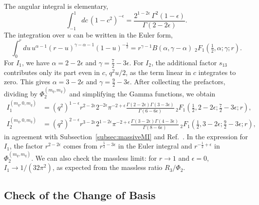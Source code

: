 The angular integral is elementary,
\begin{equation}
    \int_{-1}^{1}dc\,\left(1-c^2\right)^{-\epsilon} = \frac{2^{1-2\epsilon}\,\Gamma^2(1-\epsilon)}{\Gamma(2-2\epsilon)}.
\end{equation}
The integration over $u$ can be written in the Euler form,
\begin{equation}
    \int_0^r du\,u^{\alpha-1}(r-u)^{\gamma-\alpha-1}(1-u)^{-\frac12}
    = r^{\gamma-1}B(\alpha,\gamma-\alpha)\;{}_2F_1\!\left(\tfrac12,\alpha;\gamma;r\right).
\end{equation}
For $I_1$, we have $\alpha=2-2\epsilon$ and $\gamma=\frac72-3\epsilon$. For $I_2$, the additional
factor $s_{13}$ contributes only its part even in $c$, $q^2u/2$, as the term linear in $c$
integrates to zero. This gives $\alpha=3-2\epsilon$ and $\gamma=\frac92-3\epsilon$. After collecting
the prefactors, dividing by $\Phi_2^{(m_q,m_q)}$ and simplifying the Gamma functions, we obtain
\begin{equation}
    \begin{split}
        I_1^{(m_q,0,m_q)} &= \left(q^2\right)^{1-\epsilon}r^{2-2\epsilon}2^{-2\epsilon}\pi^{-2+\epsilon}\frac{\Gamma(2-2\epsilon)\Gamma(3-3\epsilon)}{\Gamma(6-6\epsilon)}\,{}_2F_1\!\left(\tfrac12,2-2\epsilon;\tfrac72-3\epsilon;r\right),\\
        I_2^{(m_q,0,m_q)} &= \left(q^2\right)^{2-\epsilon}r^{3-2\epsilon}2^{1-2\epsilon}\pi^{-2+\epsilon}\frac{\Gamma(3-2\epsilon)\Gamma(4-3\epsilon)}{\Gamma(8-6\epsilon)}\,{}_2F_1\!\left(\tfrac12,3-2\epsilon;\tfrac92-3\epsilon;r\right),
    \end{split}
\end{equation}
in agreement with Subsection~\ref{subsec:massiveMI} and Ref.~\cite{GehrmannDeRidder:2009fz}.
In the expression for $I_1$, the factor $r^{2-2\epsilon}$ comes from $r^{\frac52-3\epsilon}$ in the
Euler integral and $r^{-\frac12+\epsilon}$ in $\Phi_2^{(m_q,m_q)}$. We can also check the massless
limit: for $r\to1$ and $\epsilon=0$, $I_1\to1/(32\pi^2)$, as expected from the massless ratio
$R_3/\Phi_2$.

\subsection{Check of the Change of Basis}

